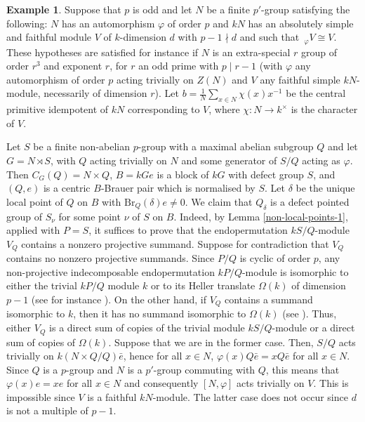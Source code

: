 \documentclass{amsart}
\theoremstyle{plain}\newtheorem{Theorem}{Theorem}[section]
\theoremstyle{plain}\newtheorem{Conjecture}[Theorem]{Conjecture}
\theoremstyle{plain}\newtheorem{Corollary}[Theorem]{Corollary}
\theoremstyle{plain}\newtheorem{Lemma}[Theorem]{Lemma}
\theoremstyle{plain}\newtheorem{Proposition}[Theorem]{Proposition}
\theoremstyle{definition}\newtheorem{Definition}[Theorem]{Definition}
\theoremstyle{definition}\newtheorem{Example}[Theorem]{Example}
\theoremstyle{definition}\newtheorem{Examples}[Theorem]{Examples}
\theoremstyle{definition}\newtheorem{Exercise}[Theorem]{Exercise}
\theoremstyle{definition}\newtheorem{Notation}[Theorem]{Notation}
\theoremstyle{definition}\newtheorem{Remark}[Theorem]{Remark}
\theoremstyle{definition}\newtheorem{Remarks}[Theorem]{Remarks}
\theoremstyle{plain}\newtheorem{Statement}[Theorem]{}
\def\Br{\mathrm{Br}}                 \def\ten{\otimes}
\begin{document}
\begin{Example}  
Suppose that $p$ is  odd  and let $N$ be a  finite  $p'$-group  satisfying the following:    
$N$    has an automorphism  $\varphi $    of  order $p$  and  $kN$ has an absolutely  
simple and  faithful  module  $V$   of $k$-dimension $d$    with $p-1 \nmid d$    and  
such that  $\,_\varphi V \cong V$.
These hypotheses  are  satisfied   for  instance  if $N$ is an extra-special  $r$ group  
of   order $r^3$  and  exponent  $r$, for $r$  an odd prime   with $p \mid r-1 $ 
(with  $\varphi $  any automorphism  of  order  $p$ acting  trivially on  $Z(N)$  
and    $V$   any faithful  simple  $kN$-module, necessarily of  dimension $r$).   
Let $ b =\frac{1}{N} \sum_{x\in N}  \chi(x) x^{-1} $  be the  central   primitive 
idempotent of  $kN$  corresponding to $V$, where $\chi:  N \to k^{\times} $  
is  the  character of $V$.

Let   $S$  be a finite non-abelian $p$-group   with a maximal abelian subgroup 
$Q$  and let $G  =  N \rtimes S $, with $Q$ acting trivially on $N$ and    some 
generator of $S/Q$ acting as  $\varphi $.    Then    $ C_G(Q)  = N \times Q $,  
$ B= kGe $  is a  block of $kG$  with defect group $S$, and  $(Q, e) $   is a  
centric  $B$-Brauer pair which is normalised by $S$.   Let $\delta $ be the 
unique local  point of $Q$ on $B$ with $\Br_Q(\delta) e \ne 0 $.      
We claim that   $Q_{\delta}$ is  a defect  pointed group of $S_{\nu}$ for 
some  point   $\nu$  of $S$  on $B$.  Indeed, by  Lemma  \ref{non-local-points-1}, 
applied with  $P=S $,   it suffices to prove that the   endopermutation  
$kS/Q$-module  $V_Q  $   contains a nonzero  projective summand.     
Suppose for contradiction  that   $V_Q  $  contains no nonzero  projective 
summands.  Since  $P/Q $ is  cyclic of order $p$, any   non-projective
indecomposable endopermutation   $kP/Q$-module   is  isomorphic to   either  
the trivial  $kP/Q$ module   $k$ or  to   its Heller translate   $\Omega (k) $ of 
dimension $p-1$ (see for instance \cite[Theorem 7.8.1]{LiBookII}).   On the 
other hand,   if $V_Q$   contains  a summand isomorphic to $k$, then  it has 
no summand isomorphic to $\Omega (k)$ (see \cite[Proposition 7.3.7]{LiBookII}). 
Thus, either  $V_Q $  is a direct sum  of  copies  of the trivial module  
$kS/Q$-module or a  direct sum  of copies  of $\Omega (k)$.    Suppose that 
we are in the former case.     Then, $S/Q$ acts trivially on $k(N\times Q/Q )\bar e $,
hence  for all $x \in N$,  $\varphi (x) Q  \bar e  =    x Q \bar e $  for all $ x\in N$.  
Since $Q$ is a  $p$-group  and   $N$  is a  $p'$-group commuting with $Q$, this 
means that  $\varphi (x)  e =    xe $ for all $x \in N$ and   consequently  
$[N, \varphi] $ acts trivially on $V$. This is impossible   since $V$  is  a faithful  
$kN $-module. The latter  case does not occur since    $d$ is not a multiple 
of $p-1 $.
\end{Example}
\end{document}
